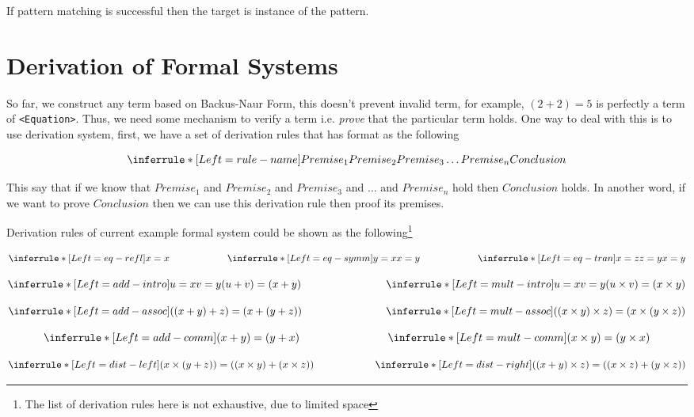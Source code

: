 \documentclass[master.tex]{subfiles}
\begin{document}
If pattern matching is successful then the target is instance of the pattern.

\section{Derivation of Formal Systems}

So far, we construct any term based on Backus-Naur Form, this doesn't prevent
invalid term, for example, $(2 + 2) = 5$ is perfectly a term of
\texttt{<Equation>}. Thus, we need some mechanism to verify a term i.e.
\emph{prove} that the particular term holds. One way to deal with this is to use
derivation system, first, we have a set of derivation rules that has format as
the following

$$ \derivRule{rule-name}{Conclusion}{Premise_1 \\ Premise_2 \\ Premise_3 \\ \ldots \\
  Premise_n} $$

This say that if we know that $Premise_1$ and $Premise_2$ and $Premise_3$ and
$\ldots$ and $Premise_n$ hold then $Conclusion$ holds. In another word, if
we want to prove $Conclusion$ then we can use this derivation rule then proof
its premises.

Derivation rules of current example formal system could be shown as the
following\footnote{The list of derivation rules here is not exhaustive, due to
limited space}

$$
\derivRule{eq-refl}{x = x}{ } \qquad  \qquad  \qquad
\derivRule{eq-symm}{x = y}{y = x} \qquad  \qquad  \qquad
\derivRule{eq-tran}{x = y}{x = z \\ z = y}
$$

$$
\derivRule{add-intro}{(u + v) = (x + y)}{u = x \\ v = y} \qquad  \qquad \qquad \qquad
\derivRule{mult-intro}{(u \times v) = (x \times y)}{u = x \\ v = y}
$$

$$
\derivRule{add-assoc}{((x + y) + z) = (x + (y + z))}{ } \qquad  \qquad  \qquad \qquad
\derivRule{mult-assoc}{((x \times y) \times z) = (x \times (y \times z))}{ }
$$

$$
\derivRule{add-comm}{(x + y) = (y + x)}{ } \qquad  \qquad  \qquad \qquad
\derivRule{mult-comm}{(x \times y) = (y \times x)}{  }
$$

$$
\derivRule{dist-left} {(x \times (y + z)) = ((x \times y) + (x
  \times z))}{ } \qquad \qquad  \qquad
\derivRule{dist-right}{((x + y) \times z) = ((x \times z) + (y
  \times z))}{ }
$$
\end{document}
